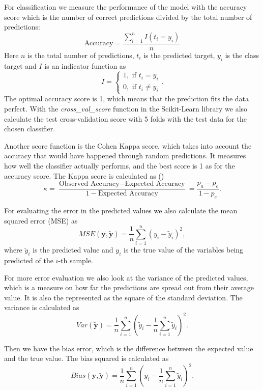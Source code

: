 \documentclass[12pt,a4paper,english]{article}
\begin{document}
For classification we measure the performance of the model with the accuracy score which is the number of correct predictions divided by the total number of predictions:
\begin{equation}
\label{eq:accuracy}
\text{Accuracy}=\frac{\sum_{i=1}^{n}I(t_i=y_i)}{n}
\end{equation}
Here $n$ is the total number of predictions, $t_i$ is the predicted target, $y_i$ is the class target and $I$ is an indicator function as
\[I=\begin{cases}
1, \text{ if } t_i=y_i\\
0, \text{ if } t_i\neq y_i
\end{cases}.\]
The optimal accuracy score is 1, which means that the prediction fits the data perfect. With the \textit{cross\_val\_score} function in the Scikit-Learn library we also calculate the test cross-validation score with 5 folds with the test data for the chosen classifier.

Another score function is the Cohen Kappa score, which takes into account the accuracy that would have happened through random predictions. It measures how well the classifier actually performs, and the best score is 1 as for the accuracy score. The Kappa score is calculated as (\cite{kappa})
\begin{equation}
\label{eq:kappa}
\kappa=\frac{\text{Observed Accuracy} - \text{Expected Accuracy}}{1-\text{Expected Accuracy}}=\frac{p_a-p_e}{1-p_e}.
\end{equation}

For evaluating the error in the predicted values we also calculate the mean squared error (MSE) as
\begin{equation}
\label{eq:mse}
MSE(\textbf{y},\tilde{\textbf{y}})=\frac{1}{n}\sum_{i=1}^{n}(y_i-\tilde{y}_i)^2,
\end{equation}
where $\tilde{y}_i$ is the predicted value and $y_i$ is the true value of the variables being predicted of the $i$-th sample.

For more error evaluation we also look at the variance of the predicted values, which is a measure on how far the predictions are spread out from their average value. It is also the represented as the square of the standard deviation. The variance is calculated as
\begin{equation}
\label{eq:var}
Var(\tilde{\textbf{y}})=\frac{1}{n}\sum_{i=1}^{n}(\tilde{y}_i-\frac{1}{n}\sum_{i=1}^{n}\tilde{y}_i)^2.
\end{equation}

Then we have the bias error, which is the difference between the expected value and the true value. The bias squared is calculated as
\begin{equation}
\label{eq:bias}
Bias(\textbf{y},\tilde{\textbf{y}})=\frac{1}{n}\sum_{i=1}^{n}(y_i-\frac{1}{n}\sum_{i=1}^{n}\tilde{y}_i)^2.
\end{equation}
\end{document}
